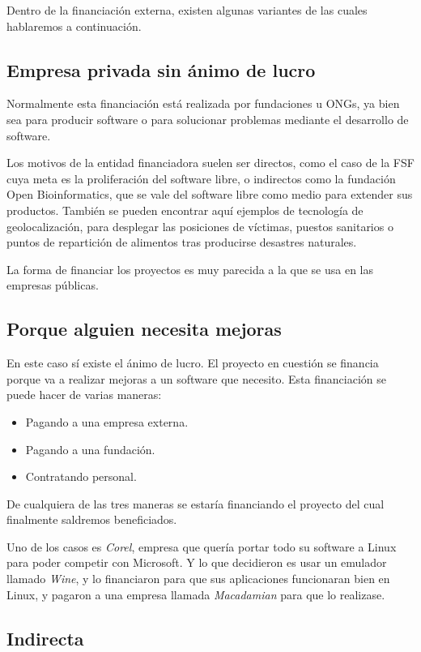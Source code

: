 Dentro de la financiación externa, existen algunas variantes de las cuales
hablaremos a continuación.

\subsection{Empresa privada sin ánimo de lucro}

Normalmente esta financiación está realizada por fundaciones u ONGs, ya bien
sea para producir software o para solucionar problemas mediante el desarrollo de
software.

Los motivos de la entidad financiadora suelen ser directos, como el
caso de la FSF cuya meta es la proliferación del software libre, o
indirectos como la fundación Open Bioinformatics, que se vale del
software libre como medio para extender sus productos. También se
pueden encontrar aquí ejemplos de tecnología de geolocalización, para
desplegar las posiciones de víctimas, puestos sanitarios o puntos de
repartición de alimentos tras producirse desastres naturales.

La forma de financiar los proyectos es muy parecida a la que se usa en las
empresas públicas.


\subsection{Porque alguien necesita mejoras}
En este caso sí existe el ánimo de lucro. El proyecto en cuestión se financia
porque va a realizar mejoras a un software que necesito.
Esta financiación se puede hacer de varias maneras:
\begin{itemize}
  \item Pagando a una empresa externa.
  \item Pagando a una fundación.
  \item Contratando personal.
\end{itemize}

De cualquiera de las tres maneras se estaría financiando el proyecto del cual
finalmente saldremos beneficiados.


Uno de los casos es \emph{Corel}, empresa que quería portar todo su software a Linux para
poder competir con Microsoft. Y lo que decidieron es usar un emulador llamado
\emph{Wine}, y lo financiaron para que sus aplicaciones funcionaran bien en
Linux, y pagaron a una empresa llamada \emph{Macadamian} para que lo realizase.

\subsection{Indirecta}

